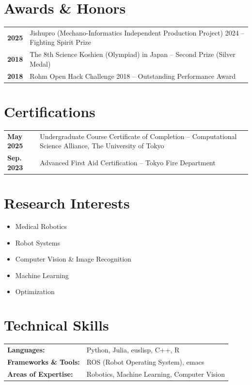 \documentclass[11pt,a4paper]{article}
\newcommand{\cvitem}[2]{\textbf{#1} & #2 \\[0.3em]}
\begin{document}
\section{Awards \& Honors}
\begin{tabularx}{\textwidth}{@{}p{2.5cm}X@{}}
\cvitem{2025}{Jishupro (Mechano-Informatics Independent Production Project) 2024 -- Fighting Spirit Prize}
\cvitem{2018}{The 8th Science Koshien (Olympiad) in Japan -- Second Prize (Silver Medal)}
\cvitem{2018}{Rohm Open Hack Challenge 2018 -- Outstanding Performance Award}
\end{tabularx}

\section{Certifications}
\begin{tabularx}{\textwidth}{@{}p{2.5cm}X@{}}
\cvitem{May 2025}{Undergraduate Course Certificate of Completion -- Computational Science Alliance, The University of Tokyo}
\cvitem{Sep. 2023}{Advanced First Aid Certification -- Tokyo Fire Department}
\end{tabularx}

\section{Research Interests}
\begin{itemize}[leftmargin=1cm,itemsep=0.2em]
    \item Medical Robotics
    \item Robot Systems
    \item Computer Vision \& Image Recognition
    \item Machine Learning
    \item Optimization
\end{itemize}

\section{Technical Skills}
\begin{tabularx}{\textwidth}{@{}p{4cm}X@{}}
\textbf{Languages:} & Python, Julia, euslisp, C++, R \\[0.3em]
\textbf{Frameworks \& Tools:} & ROS (Robot Operating System), emacs\\[0.3em]
\textbf{Areas of Expertise:} & Robotics, Machine Learning, Computer Vision
\end{tabularx}
\end{document}
